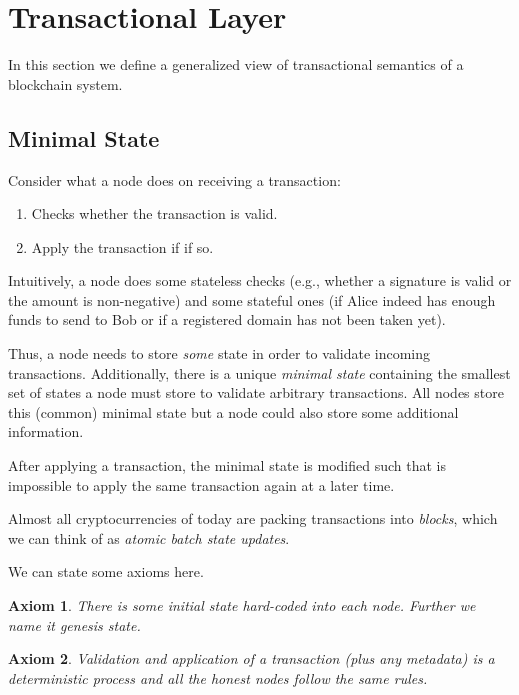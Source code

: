 \documentclass[]{report}   %
\newtheorem{axiom}{Axiom}
\begin{document}


\section{Transactional Layer}

In this section we define a generalized view of transactional semantics of a blockchain system. %

\subsection{Minimal State}     %
	Consider what a node does on receiving a transaction:

    \begin{enumerate}
		\item Checks whether the transaction is valid.
		\item Apply the transaction if if so.
    \end{enumerate}

	Intuitively, a node does some stateless checks (e.g., whether a signature is valid or the amount is non-negative) and some stateful ones (if Alice indeed has enough funds to send to Bob or if a registered domain has not been taken yet). 

	Thus, a node needs to store {\em some} state in order to validate incoming transactions. Additionally, there is a unique \textit{minimal state} containing the smallest set of states a node must store to validate arbitrary transactions. All nodes store this (common) minimal state but a node could also store some additional information. %

	After applying a transaction, the minimal state is modified such that is impossible to apply the same transaction again at a later time. 

	Almost all cryptocurrencies of today are packing transactions into \textit{blocks}, which we can think of as \textit{atomic batch state updates}. 

   We can state some axioms here.

	\begin{axiom}
	 There is some initial state hard-coded into each node. Further we name it \textit{genesis state}.
	\end{axiom}

    \begin{axiom} 
     Validation and application of a transaction (plus any metadata) is a deterministic process and all the honest nodes follow the same rules. 
    \end{axiom}
\end{document}
